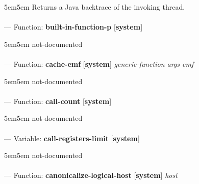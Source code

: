 \begin{adjustwidth}{5em}{5em}
Returns a Java backtrace of the invoking thread.
\end{adjustwidth}

\paragraph{}
\label{SYSTEM:BUILT-IN-FUNCTION-P}
--- Function: \textbf{built-in-function-p} [\textbf{system}] \textit{}

\begin{adjustwidth}{5em}{5em}
not-documented
\end{adjustwidth}

\paragraph{}
\label{SYSTEM:CACHE-EMF}
--- Function: \textbf{cache-emf} [\textbf{system}] \textit{generic-function args emf}

\begin{adjustwidth}{5em}{5em}
not-documented
\end{adjustwidth}

\paragraph{}
\label{SYSTEM:CALL-COUNT}
--- Function: \textbf{call-count} [\textbf{system}] \textit{}

\begin{adjustwidth}{5em}{5em}
not-documented
\end{adjustwidth}

\paragraph{}
\label{SYSTEM:CALL-REGISTERS-LIMIT}
--- Variable: \textbf{call-registers-limit} [\textbf{system}] \textit{}

\begin{adjustwidth}{5em}{5em}
not-documented
\end{adjustwidth}

\paragraph{}
\label{SYSTEM:CANONICALIZE-LOGICAL-HOST}
--- Function: \textbf{canonicalize-logical-host} [\textbf{system}] \textit{host}

